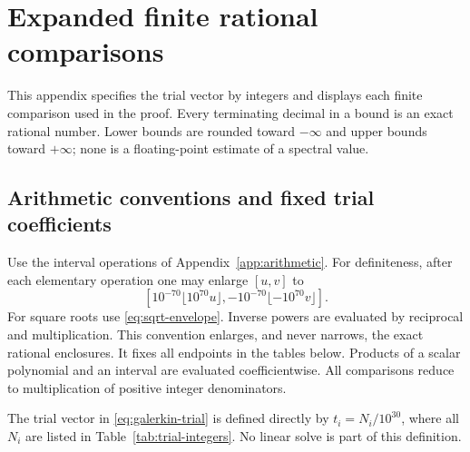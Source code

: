 \section{Expanded finite rational comparisons}\label{app:expanded-data}
This appendix specifies the trial vector by integers and displays each finite
comparison used in the proof. Every terminating decimal in a bound is an exact
rational number. Lower bounds are rounded toward $-\infty$ and upper bounds
toward $+\infty$; none is a floating-point estimate of a spectral value.

\subsection{Arithmetic conventions and fixed trial coefficients}
Use the interval operations of Appendix~\ref{app:arithmetic}. For definiteness,
after each elementary operation one may enlarge $[u,v]$ to
\[
 [10^{-70}\lfloor10^{70}u\rfloor,
  -10^{-70}\lfloor-10^{70}v\rfloor].
\]
For square roots use \eqref{eq:sqrt-envelope}. Inverse powers are evaluated by
reciprocal and multiplication. This convention enlarges, and never narrows,
the exact rational enclosures. It fixes all endpoints in the tables below.
Products of a scalar polynomial and an interval are evaluated coefficientwise.
All comparisons reduce to multiplication of positive integer denominators.

The trial vector in \eqref{eq:galerkin-trial} is defined directly by
$t_i=N_i/10^{30}$, where all $N_i$ are listed in
Table~\ref{tab:trial-integers}. No linear solve is part of this definition.

